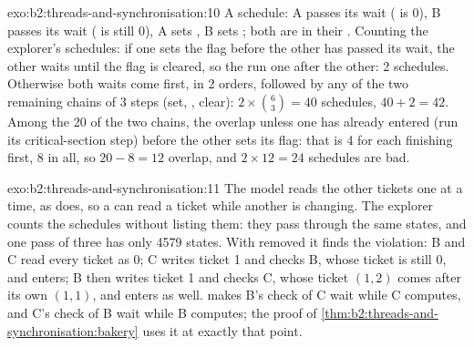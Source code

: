 \begin{solution}{exo:b2:threads-and-synchronisation:10}
A schedule: A passes its wait ( is 0), B passes its wait ( is still 0), A sets , B
sets ; both are in their . Counting the explorer's schedules: if one  sets the
flag before the other has passed its wait, the other waits until the flag is cleared, so the  run one after
the other: 2 schedules. Otherwise both waits come first, in 2 orders, followed by any  of the two remaining
chains of 3 steps (set, , clear): $2 \times \binom{6}{3} = 40$ schedules, $40 + 2 = 42$. Among the 20
 of the two chains, the  overlap unless one  has already entered (run its
critical-section step) before the other sets its flag: that is 4  for each  finishing first, 8 in
all, so $20 - 8 = 12$ overlap, and $2 \times 12 = 24$ schedules are bad.
\end{solution}

\begin{solution}{exo:b2:threads-and-synchronisation:11}
The model reads the other tickets one at a time, as  does, so a  can read a ticket while another
is changing. The explorer counts the schedules without listing them: they pass through the same states, and one pass
of three  has only 4579 states. With  removed it finds the violation: B and C read every ticket as 0; C
writes ticket 1 and checks B, whose ticket is still 0, and enters; B then writes ticket 1 and checks C, whose ticket
$(1, 2)$ comes after its own $(1, 1)$, and enters as well.  makes B's check of C wait while C computes,
and C's check of B wait while B computes; the proof of \cref{thm:b2:threads-and-synchronisation:bakery} uses it at
exactly that point.
\end{solution}

